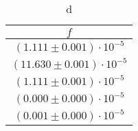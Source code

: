 \begin{table}[H]
    \centering
        \begin{tabular}{|c|}
        \hline
        $ f $\\
        \hline
        $ (1.111 \pm 0.001) \cdot 10^{-5} $\\
        \hline
        $ (11.630 \pm 0.001) \cdot 10^{-5} $\\
        \hline
        $ (1.111 \pm 0.001) \cdot 10^{-5} $\\
        \hline
        $ (0.000 \pm 0.000) \cdot 10^{-5} $\\
        \hline
        $ (0.001 \pm 0.000) \cdot 10^{-5} $\\
        \hline
        \end{tabular}
    \caption{d}
\end{table}

